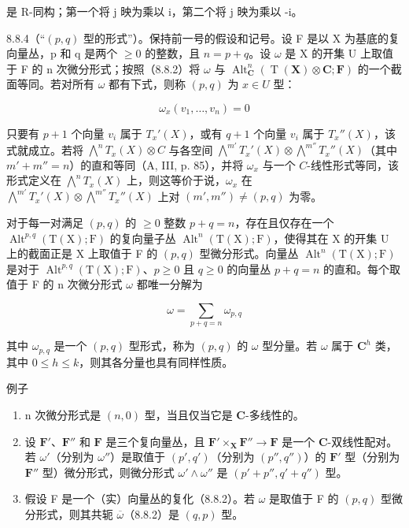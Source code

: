 是 R-同构；第一个将 j 映为乘以 i，第二个将 j 映为乘以 -i。

8.8.4（“\((p,q)\) 型的形式”）。保持前一号的假设和记号。设 F 是以 X 为基底的复向量丛，p 和 q 是两个 \(\geqslant0\) 的整数，且 \(n=p+q\)。设 \(\omega\) 是 X 的开集 U 上取值于 F 的 n 次微分形式；按照（8.8.2）将 \(\omega\) 与 \(\operatorname{Alt}_{\mathbf{C}}^{n}(\operatorname{T}(\mathbf{X})\otimes\mathbf{C};\mathbf{F})\) 的一个截面等同。若对所有 \(\omega\) 都有下式，则称 \((p,q)\) 为 \(x\in U\) 型：

\[
\omega_ {x} (v _ {1}, \dots , v _ {n}) = 0
\]

只要有 \(p + 1\) 个向量 \(v_i\) 属于 \(T_x'(X)\)，或有 \(q + 1\) 个向量 \(v_i\) 属于 \(T_x''(X)\)，该式就成立。若将 \(\bigwedge^n T_x(X) \otimes C\) 与各空间 \(\bigwedge^{m'} T_x'(X) \otimes \bigwedge^{m''} T_x''(X)\)（其中 \(m' + m'' = n\)）的直和等同（A, III, p. 85），并将 \(\omega_x\) 与一个 \(C\)-线性形式等同，该形式定义在 \(\bigwedge^n T_x(X)\) 上，则这等价于说，\(\omega_x\) 在 \(\bigwedge^{m'} T_x'(X) \otimes \bigwedge^{m''} T_x''(X)\) 上对 \((m', m'') \neq (p, q)\) 为零。

对于每一对满足 \((p,q)\) 的 \(\geqslant0\) 整数 \(p+q=n\)，存在且仅存在一个 \(\operatorname{Alt}^{p,q}(\mathrm{T}(\mathrm{X});\mathrm{F})\) 的复向量子丛 \(\operatorname{Alt}^{n}(\mathrm{T}(\mathrm{X});\mathrm{F})\)，使得其在 X 的开集 U 上的截面正是 X 上取值于 F 的 \((p,q)\) 型微分形式。向量丛 \(\operatorname{Alt}^{n}(\mathrm{T}(\mathrm{X});\mathrm{F})\) 是对于 \(\operatorname{Alt}^{p,q}(\mathrm{T}(\mathrm{X});\mathrm{F})\)、\(p\geqslant0\) 且 \(q\geqslant0\) 的向量丛 \(p+q=n\) 的直和。每个取值于 F 的 n 次微分形式 \(\omega\) 都唯一分解为

\[
\omega = \sum_ {p + q = n} \omega_ {p, q}
\]

其中 \(\omega_{p,q}\) 是一个 \((p,q)\) 型形式，称为 \((p,q)\) 的 \(\omega\) 型分量。若 \(\omega\) 属于 \(\mathbf{C}^h\) 类，其中 \(0 \leqslant h \leqslant k\)，则其各分量也具有同样性质。

例子

\begin{enumerate}
\def\labelenumi{\alph{enumi})}
\item
  n 次微分形式是 \((n, 0)\) 型，当且仅当它是 \(\mathbf{C}\)-多线性的。
\item
  设 \(\mathbf{F}'\)、\(\mathbf{F}''\) 和 \(\mathbf{F}\) 是三个复向量丛，且 \(\mathbf{F}' \times_{\mathbf{X}} \mathbf{F}'' \to \mathbf{F}\) 是一个 \(\mathbf{C}\)-双线性配对。若 \(\omega'\)（分别为 \(\omega''\)）是取值于 \((p',q')\)（分别为 \((p'',q'')\)）的 \(\mathbf{F}'\) 型（分别为 \(\mathbf{F}''\) 型）微分形式，则微分形式 \(\omega' \wedge \omega''\) 是 \((p' + p'',q' + q'')\) 型。
\item
  假设 F 是一个（实）向量丛的复化（8.8.2）。若 \(\omega\) 是取值于 F 的 \((p, q)\) 型微分形式，则其共轭 \(\overline{\omega}\)（8.8.2）是 \((q, p)\) 型。
\end{enumerate}

